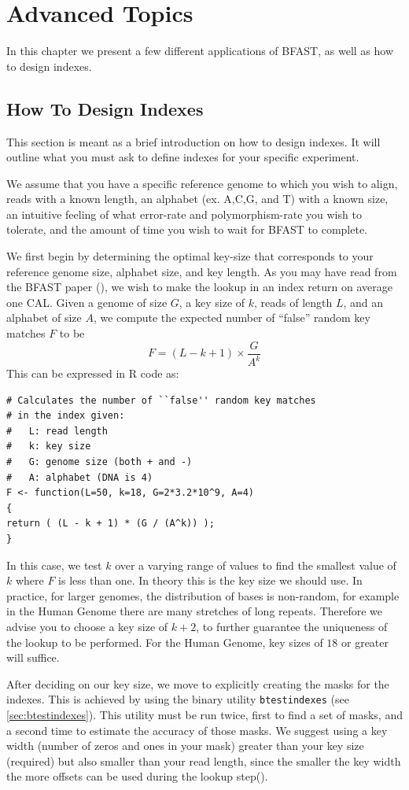 \documentclass[a4paper,12pt]{book}
\newcommand{\TT}[1]{{\tt #1}} %
\begin{document}
\chapter{Advanced Topics}
In this chapter we present a few different applications of BFAST, as well as how to design indexes.
\section{How To Design  Indexes}
\label{sec:design-indexes}
This section is meant as a brief introduction on how to design indexes.
It will outline what you must ask to define indexes for your specific experiment.

We assume that you have a specific reference genome to which you wish to align, reads with a known length, an alphabet (ex. A,C,G, and T) with a known size, an intuitive feeling of what error-rate and polymorphism-rate you wish to tolerate, and the amount of time you wish to wait for BFAST to complete.

We first begin by determining the optimal key-size that corresponds to your reference genome size, alphabet size, and key length.
As you may have read from the BFAST paper (\cite{BFAST}), we wish to make the lookup in an index return on average one CAL.
Given a genome of size $G$, a key size of $k$, reads of length $L$, and an alphabet of size $A$, we compute the expected number of ``false'' random key matches $F$ to be
\[F=(L-k+1)\times \frac{G}{A^k}\]
This can be expressed in R code as:
\begin{verbatim}
# Calculates the number of ``false'' random key matches
# in the index given:
#   L: read length
#   k: key size
#   G: genome size (both + and -)
#   A: alphabet (DNA is 4)
F <- function(L=50, k=18, G=2*3.2*10^9, A=4)
{
return ( (L - k + 1) * (G / (A^k)) );
}
\end{verbatim}
In this case, we test $k$ over a varying range of values to find the smallest value of $k$ where $F$ is less than one.
In theory this is the key size we should use.
In practice, for larger genomes, the distribution of bases is non-random, for example in the Human Genome there are many stretches of long repeats.
Therefore we advise you to choose a key size of $k+2$, to further guarantee the uniqueness of the lookup to be performed.
For the Human Genome, key sizes of $18$ or greater will suffice.

After deciding on our key size, we move to explicitly creating the masks for the indexes.
This is achieved by using the binary utility \TT{btestindexes} (see \autoref{sec:btestindexes}).
This utility must be run twice, first to find a set of masks, and a second time to estimate the accuracy of those masks.
We suggest using a key width (number of zeros and ones in your mask) greater than your key size (required) but also smaller than your read length, since the smaller the key width the more offsets can be used during the lookup step(\cite{BFAST}).
\end{document}
